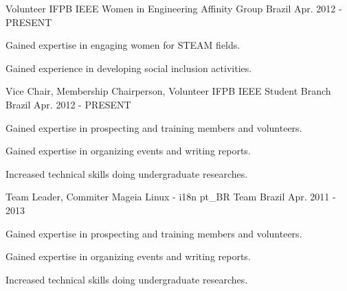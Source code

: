 \begin{cventries}
  \cventry
    {Volunteer} %
    {IFPB IEEE Women in Engineering Affinity Group} %
    {Brazil} %
    {Apr. 2012 - PRESENT} %
    {
      \begin{cvitems} %
        \item {Gained expertise in engaging women for STEAM fields.}
        \item {Gained experience in developing social inclusion activities.}
      \end{cvitems}
    }

  \cventry
    {Vice Chair, Membership Chairperson, Volunteer} %
    {IFPB IEEE Student Branch} %
    {Brazil} %
    {Apr. 2012 - PRESENT} %
    {
      \begin{cvitems} %
        \item {Gained expertise in prospecting and training members and volunteers.}
        \item {Gained expertise in organizing events and writing reports.}
        \item {Increased technical skills doing undergraduate researches.}
      \end{cvitems}
    }
    
    
  \cventry
    {Team Leader, Commiter} %
    {Mageia Linux - i18n pt\_BR Team} %
    {Brazil} %
    {Apr. 2011 - 2013} %
    {
      \begin{cvitems} %
        \item {Gained expertise in prospecting and training members and volunteers.}
        \item {Gained expertise in organizing events and writing reports.}
        \item {Increased technical skills doing undergraduate researches.}
      \end{cvitems}
    }

\end{cventries}
